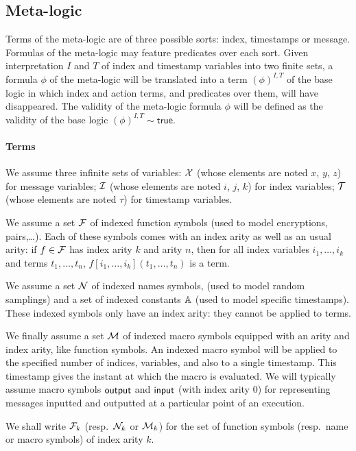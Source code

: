 \subsection{Meta-logic}

Terms of the meta-logic are of three possible sorts: index, timestamps
or message. Formulas of the meta-logic may feature predicates over each sort.
Given interpretation $I$ and $T$ of index and timestamp variables
into two finite sets, a formula $\phi$ of the meta-logic will be translated
into a term $(\phi)^{I,T}$ of the base logic in which index and action terms,
and predicates over them, will have disappeared. The validity of the
meta-logic formula $\phi$ will be defined as the validity of the base logic
$(\phi)^{I,T}\sim\mathsf{true}$.

\paragraph{Terms}

We assume three infinite sets of variables:
$\mathcal{X}$ (whose elements are noted $x$, $y$, $z$) for message variables;
$\mathcal{I}$ (whose elements are noted $i$, $j$, $k$) for index variables;
$\mathcal{T}$ (whose elements are noted $\tau$) for timestamp variables.

We assume a set $\mathcal{F}$ of indexed function symbols
(used to model encryptions, pairs,\dots).
Each of these symbols comes with an index arity as well as an usual arity:
if $f\in\mathcal{F}$ has index arity $k$ and arity $n$,
then for all index variables $i_1,\ldots,i_k$ and terms $t_1,\ldots,t_n$,
$f[i_1,\ldots,i_k](t_1,\ldots,t_n)$ is a term.

We assume a set $\mathcal{N}$ of indexed names symbols,
(used to model random samplings)
and a set of indexed constants $\mathbb{A}$
(used to model specific timestamps).
These indexed symbols only have an index arity: they
cannot be applied to terms.

We finally assume a set $\mathcal{M}$ of indexed macro symbols
equipped with an arity and index arity, like function symbols.
An indexed macro symbol will be applied to the specified number of
indices, variables, and also to a single timestamp.
This timestamp gives the instant at which the macro is evaluated.
We will typically assume macro symbols $\textsf{output}$ and $\textsf{input}$
(with index arity $0$) for representing messages inputted and outputted
at a particular point of an execution.

We shall write $\mathcal{F}_k$ (resp.\ $\mathcal{N}_k$ or $\mathcal{M}_k$) for the set of function
symbols (resp.\ name or macro symbols) of index arity $k$.

